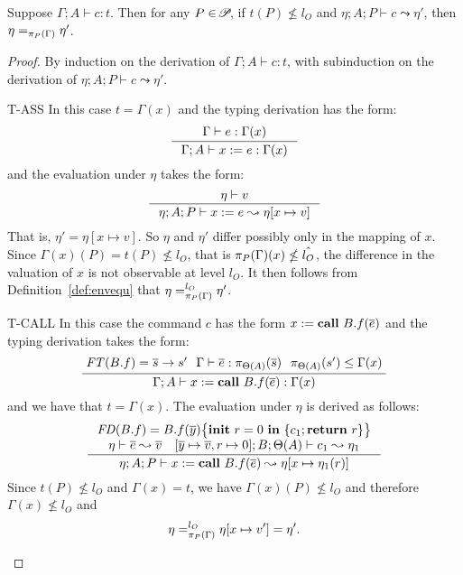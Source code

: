 {{{%

\begin{lemma}\label{lem:comsafe}
Suppose $\Gamma; A \vdash c : t$. Then for any $P\in\!\mathscr{P}\!$,
if $t(P)\nleq l_{O}$ and $\eta;A; P \vdash c \leadsto \eta' $, then
$\eta =_{\pi_{{P}}({\Gamma})} \eta'$.
\end{lemma}
\begin{proof}
By induction on the derivation of $\Gamma; A \vdash c : t$, with subinduction
on the derivation of $\eta;A; P \vdash c \leadsto \eta'.$

\begin{ProofEnumDesc}
\item[T-ASS]
In this case $t = \Gamma(x)$ and
the typing derivation has the form:
\begin{equation*}
\inference
{\Gamma \vdash e : \Gamma(x)}
{\Gamma; A  \vdash \lcASS{x}{e} : \Gamma(x)}
\end{equation*}
and the evaluation under $\eta$ takes the form:
$$
\inference
{\eta \vdash v}
{\eta; A; P \vdash \lcASS{x}{e} \leadsto \eta[x \mapsto v] }
$$
That is, $\eta' = \eta[x \mapsto v].$
So $\eta$ and $\eta'$ differ possibly
only in the mapping of $x$.
Since $\Gamma(x)(P) = t(P) \nleq l_{O}$,
that is $\pi_{{P}}({\Gamma})(x) \nleq \hat{l_{O}}$,
the difference in the valuation of $x$ is not observable
at level $l_O.$
It then follows from Definition~\ref{def:envequ}
that $\eta =_{\pi_{{P}}({\Gamma})}^{l_{O}} \eta' $.

\item[T-CALL] In this case
the command $c$ has the form
${x}:=\textbf{call}~{B.f}({\overline{e}})$
and the typing derivation
takes the form:
$$
\setpremisesspace{7pt}
\setpremisesend{3pt}
\inference
{
\FT(B.f) = \overline{s} \rightarrow {s'} &
\Gamma \vdash \overline{e} : \app{\overline{s}}{\Theta(A)} &
\app{s'}{\Theta(A)} \leq \Gamma(x)}
{\Gamma; A \vdash \lcCALL{x}{B.f}{\overline{e}} : \Gamma(x) }
$$
and we have that
$t = \Gamma(x).$
The evaluation under $\eta$ is derived as follows:
$$
\inference{
\FD(B.f) = \lpFUN{B.f}{\overline{y}}{c_1} \\
\eta\vdash\overline{e} \leadsto \overline{v} \quad
[\overline{y} \mapsto \overline{v}, r \mapsto 0] ; B; \Theta(A) \vdash c_1
\leadsto \eta_1
}
{\eta;A;P \vdash \lcCALL{x}{B.f}{\overline{e}} \leadsto
\eta [x \mapsto \eta_1(r) ]}
$$
Since $t(P) \not \leq l_O$ and $\Gamma(x) = t$, we have
$\Gamma(x)(P) \not \leq l_O$
and therefore $\Gamma(x) \not \leq l_O$
and
$$\eta =^{l_O}_{\pi_{{P}}({\Gamma})} \eta[x \mapsto v'] = \eta'.$$


\end{ProofEnumDesc}
\end{proof}}}}
